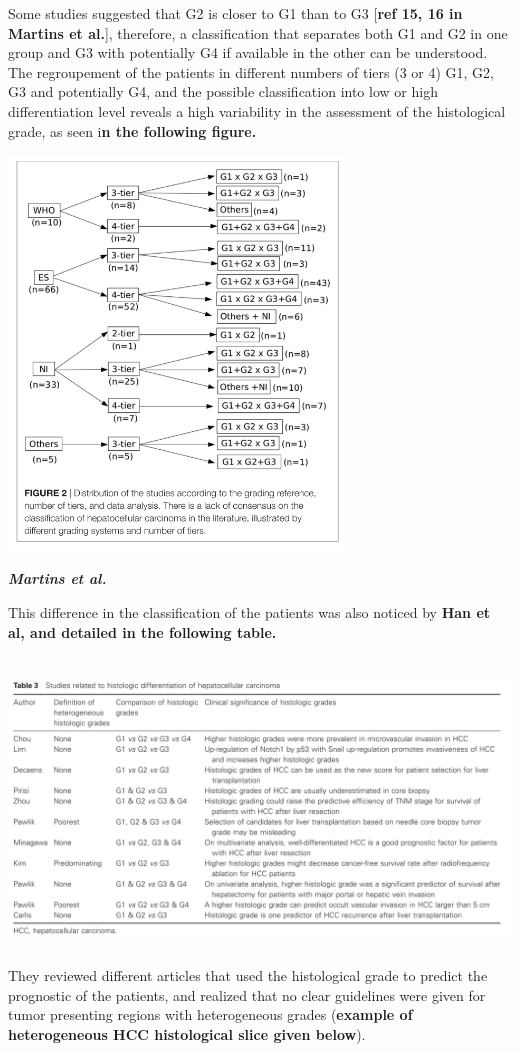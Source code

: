 \documentclass[]{article}
\begin{document}
Some studies suggested that G2 is closer to G1 than to G3 {[}\textbf{ref
15, 16 in Martins et al.}{]}, therefore, a classification that separates
both G1 and G2 in one group and G3 with potentially G4 if available in
the other can be understood.\\
The regroupement of the patients in different numbers of tiers (3 or 4)
G1, G2, G3 and potentially G4, and the possible classification into low
or high differentiation level reveals a high variability in the
assessment of the histological grade, as seen i\textbf{n the following
figure.}

\includegraphics[width=3.49818in,height=4.12223in]{./images/media/image1.png}

\emph{\textbf{Martins et al.}}

This difference in the classification of the patients was also noticed
by \textbf{Han et al, and detailed in the following table.}

\includegraphics[width=6.26772in,height=3.18056in]{./images/media/image9.png}
They reviewed different articles that used the histological grade to
predict the prognostic of the patients, and realized that no clear
guidelines were given for tumor presenting regions with heterogeneous
grades (\textbf{example of heterogeneous HCC histological slice given
below}).
\end{document}
